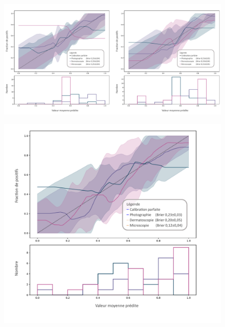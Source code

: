 \begin{figure}[H]
    \centering
    \includegraphics[width=\linewidth]{contents/chapter_7/resources/results_calibration_sequential_calibrated.pdf}
    \caption{}
    \label{fig:results_calibration_sequential_calibrated}
\end{figure}\par

\begin{figure}[H]
    \centering
    \includegraphics[width=\linewidth]{contents/chapter_7/resources/results_calibration_cumulative.pdf}
    \caption{}
    \label{fig:results_calibration_cumulative}
\end{figure}\par

